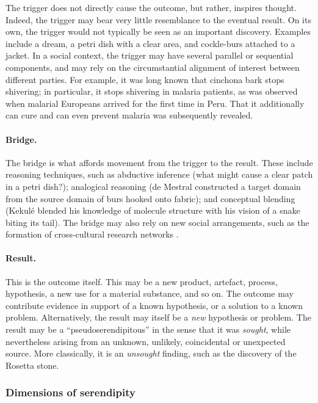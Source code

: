 The trigger does not directly cause the outcome, but rather, inspires
thought.  Indeed, the trigger may bear very little resemblance to the
eventual result.  On its own, the trigger would not typically be seen
as an important discovery.  Examples include a dream, a petri dish
with a clear area, and cockle-burs attached to a jacket.  In a social
context, the trigger may have several parallel or sequential
components, and may rely on the circumstantial alignment of interest
between different parties.  For example, it was long known that
cinchona bark stops shivering; in particular, it stops shivering in
malaria patients, as was observed when malarial Europeans arrived for
the first time in Peru.  That it additionally can cure and can even
prevent malaria was subsequently revealed.

\paragraph{Bridge.}

The bridge is what affords movement from the trigger to the result.
These include reasoning techniques, such as abductive inference (what
might cause a clear patch in a petri dish?); analogical reasoning (de
Mestral constructed a target domain from the source domain of burs
hooked onto fabric); and conceptual blending (Kekul\'e blended his
knowledge of molecule structure with his vision of a snake biting its
tail).  The bridge may also rely on new social arrangements, such as
the formation of cross-cultural research networks
\cite{companions-in-geography}.

\paragraph{Result.}

This is the outcome itself. This may be a new product, artefact,
process, hypothesis, a new use for a material substance, and so on.
The outcome may contribute evidence in support of a known hypothesis,
or a solution to a known problem.  Alternatively, the result may
itself be a {\em new} hypothesis or problem.  The result may be a
``pseudoserendipitous'' in the sense that it was {\em sought}, while
nevertheless arising from an unknown, unlikely, coincidental or
unexpected source.  More classically, it is an \emph{unsought}
finding, such as the discovery of the Rosetta stone.


\subsubsection*{Dimensions of serendipity}


